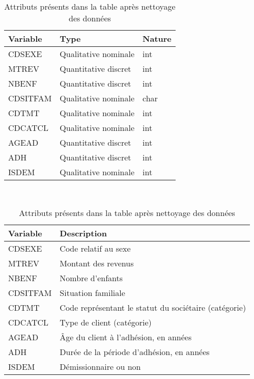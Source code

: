\documentclass{ceri/sty/rapport}
\begin{document}
\begin{table}[htb!]
	\begin{tabular}{l l l}
		\hline
		\rowcolor{fgLightRed} 
		\textbf{Variable} & \textbf{Type} & \textbf{Nature}	\\ 
		\hline
             CDSEXE & Qualitative nominale & int \\
             MTREV & Quantitative discret & int \\
             NBENF & Quantitative discret & int \\
             CDSITFAM & Qualitative nominale & char \\
             CDTMT & Qualitative nominale & int \\
             CDCATCL & Qualitative nominale & int \\
             AGEAD & Quantitative discret & int \\
             ADH & Quantitative discret & int \\
             ISDEM & Qualitative nominale & int \\
		\hline
	\end{tabular} \\
        \begin{tabular}{l l}
		\hline
		\rowcolor{fgLightRed} 
		\textbf{Variable} & \textbf{Description} \\ 
		\hline
             CDSEXE & Code relatif au sexe \\
             MTREV & Montant des revenus \\
             NBENF & Nombre d’enfants \\
             CDSITFAM & Situation familiale \\
             CDTMT & Code représentant le statut du sociétaire (catégorie) \\
             CDCATCL & Type de client (catégorie) \\
             AGEAD & Âge du client à l’adhésion, en années \\
             ADH & Durée de la période d’adhésion, en années \\
             ISDEM & Démissionnaire ou non \\
		\hline
	\end{tabular}
	\caption[]{Attributs présents dans la table après nettoyage des données}
	\label{tab:attrTableClean}
\end{table}
\end{document}
